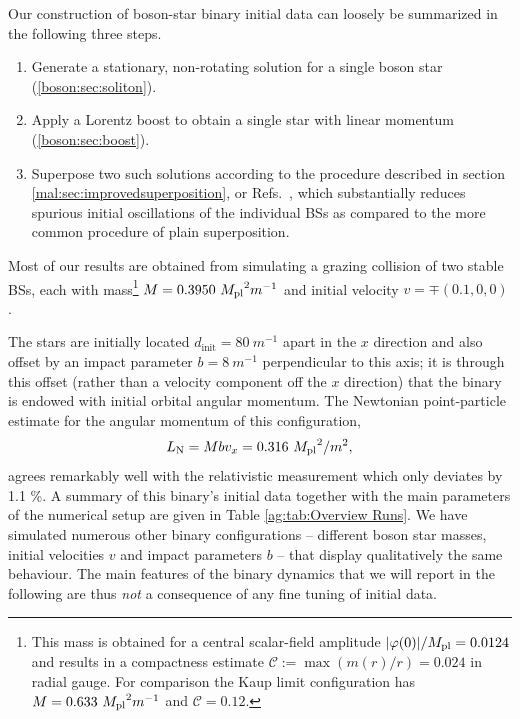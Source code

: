 Our construction of boson-star binary initial data can loosely
be summarized in the following three steps.
\begin{enumerate}
    \item Generate a stationary, non-rotating solution for a single boson star (\ref{boson:sec:soliton}).
    \item Apply a Lorentz boost to obtain a single star with linear momentum (\ref{boson:sec:boost}).
    \item Superpose two such solutions
    according to the procedure described in section \ref{mal:sec:improvedsuperposition}, or
    Refs.~\cite{Helfer:2018vtq,Helfer:2021brt}, which
    substantially reduces spurious initial oscillations of the
    individual BSs as compared to the more common procedure
    of plain superposition.
\end{enumerate}

Most of our results are obtained from
simulating a grazing collision of two stable BSs, each with mass\footnote{This mass is obtained for a central scalar-field amplitude $|\varphi(0)|/{M_{\rm pl}} =0.0124$ and results in a compactness estimate
$\mathcal{C} := \max (m(r)/r) = 0.024$ in radial gauge.
For comparison the Kaup limit configuration has
$M=0.633~{M_{\rm pl}}^2 m^{-1}$ and $\mathcal{C} = 0.12$.}  $M = 0.3950
~{M_{\rm pl}}^2 m^{-1}$ and
initial velocity $v = \mp(0.1,0,0)$.



%
The stars are initially located $d_{\text{init}} = 80~m^{-1}$
apart in the $x$ direction and also offset by an impact parameter
$b=8~m^{-1}$ perpendicular to this axis; it is through this offset
(rather than a velocity component off the $x$ direction) that
the binary is endowed with initial orbital angular momentum.
The Newtonian point-particle estimate for the angular momentum
of this configuration,
%
\begin{equation}
    L_{ \rm N} =  M b v_x = 0.316~{M_{\rm pl}}^2/m^2,
\end{equation}
%
agrees remarkably well with the relativistic measurement which only deviates by 1.1 \%.
A summary of this binary's initial data together with the main parameters of the numerical setup are given in Table \ref{ag:tab:Overview Runs}. We have simulated numerous other
binary configurations -- different boson star masses, initial velocities $v$ and impact parameters $b$ -- that display qualitatively
the same behaviour. The main features of the binary dynamics
that we will report in the following are thus {\it not} a
consequence of any fine tuning of initial data.


